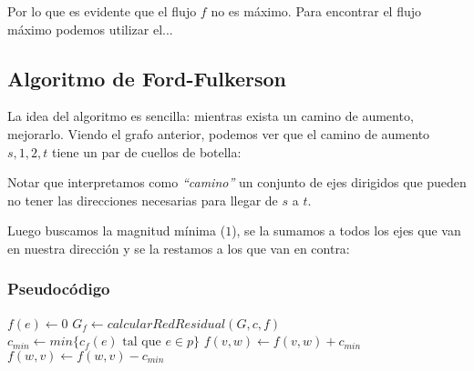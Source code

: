 Por lo que es evidente que el flujo $f$ no es m\'aximo. Para encontrar el flujo m\'aximo podemos utilizar el...

\subsection{Algoritmo de Ford-Fulkerson}

La idea del algoritmo es sencilla: mientras exista un camino de aumento, mejorarlo. Viendo el grafo anterior, podemos ver que el camino de aumento $s,1,2,t$ tiene un par de cuellos de botella:

\begin{figure}[htb]
    \centering
    
\end{figure}

Notar que interpretamos como \emph{``camino''} un conjunto de ejes dirigidos que pueden no tener las direcciones necesarias para llegar de $s$ a $t$. 

Luego buscamos la magnitud m\'inima ($1$), se la sumamos a todos los ejes que van en nuestra direcci\'on y se la restamos a los que van en contra:


\begin{figure}[htb]
    \centering
    
\end{figure}

\newpage
\subsubsection*{Pseudoc\'odigo}
\begin{algorithm}
\begin{algorithmic}[1]
    \State $f(e) \gets 0$
  \EndFor
  \State $G_f \gets calcularRedResidual(G, c, f)$
    \State $c_{min} \gets min\{c_f(e) \textrm{ tal que } e \in p\}$
        \State $f(v,w) \gets f(v,w) + c_{min}$
        \State $f(w,v) \gets f(w,v) - c_{min}$ 
    \EndFor
  \EndWhile
\EndFunction
\end{algorithmic}
\end{algorithm}

